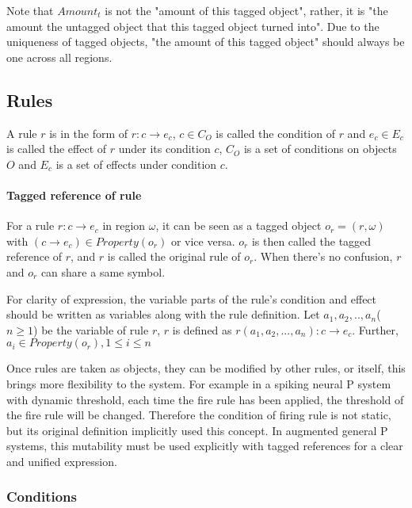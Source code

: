 \documentclass[9pt,a4paper,twoside]{article}
\begin{document}
                    Note that $Amount_t$ is not the "amount of this tagged object", rather, it is "the amount the untagged object that this tagged object turned into".
                    Due to the uniqueness of tagged objects, "the amount of this tagged object" should always be one across all regions.

\subsection{Rules}

    A rule $r$ is in the form of $r: c \rightarrow e_c$, $c \in C_O$ is called the condition of $r$ and $e_c \in E_c$ is called the effect of $r$ under its
    condition $c$, $C_O$ is a set of conditions on objects $O$ and $E_c$ is a set of effects under condition $c$.

\paragraph{Tagged reference of rule}
    
            For a rule $r: c \rightarrow e_c$ in region $\omega$, it can be seen as a tagged object $o_r = (r, \omega)$ with $(c \rightarrow e_c) \in Property(o_r)$
            or vice versa. $o_r$ is then called the tagged reference of $r$, and $r$ is called the original rule of $o_r$. When there's no confusion, $r$ and $o_r$
            can share a same symbol.

            For clarity of expression, the variable parts of the rule's condition and effect should be written as variables along with the rule definition. Let
            $a_1, a_2,..,a_n$($n \geq 1$) be the variable of rule $r$, $r$ is defined as $r(a_1, a_2,...,a_n): c \rightarrow e_c$.
            Further, $a_i \in Property(o_r), 1 \leq i \leq n$

            Once rules are taken as objects, they can be modified by other rules, or itself, this brings more flexibility to the system. For example in a spiking neural  
            P system with dynamic threshold, each time the fire rule has been applied, the threshold of the fire rule will be changed. Therefore the condition of firing
            rule is not static, but its original definition implicitly used this concept. In augmented general P systems, this mutability must be used explicitly with
            tagged references for a clear and unified expression.

\subsubsection{Conditions}
        
\end{document}
